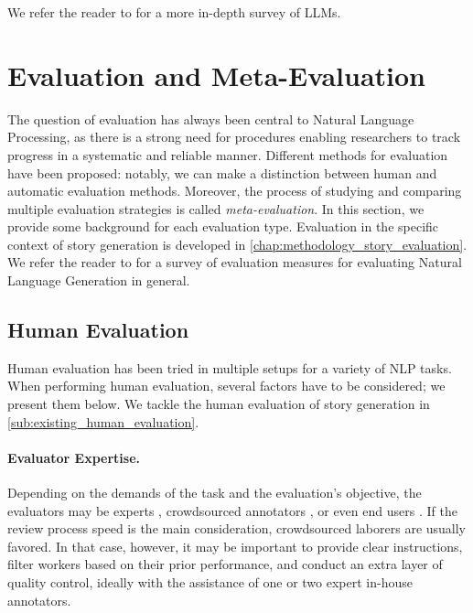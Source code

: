 We refer the reader to \citet{zhao2023survey} for a more in-depth survey of LLMs.

\section{Evaluation and Meta-Evaluation}
\label{sec:eval_and_meta}

The question of evaluation has always been central to Natural Language Processing, as there is a strong need for procedures enabling researchers to track progress in a systematic and reliable manner. Different methods for evaluation have been proposed: notably, we can make a distinction between human and automatic evaluation methods. Moreover, the process of studying and comparing multiple evaluation strategies is called \emph{meta-evaluation}. In this section, we provide some background for each evaluation type. Evaluation in the specific context of story generation is developed in \autoref{chap:methodology_story_evaluation}. We refer the reader to \citep{sai2022survey} for a survey of evaluation measures for evaluating Natural Language Generation in general.

\subsection{Human Evaluation}

Human evaluation has been tried in multiple setups for a variety of NLP tasks. When performing human evaluation, several factors have to be considered; we present them below. We tackle the human evaluation of story generation in \autoref{sub:existing_human_evaluation}.

\paragraph{Evaluator Expertise.} Depending on the demands of the task and the evaluation's objective, the evaluators may be experts \citep{belz-reiter-2006-comparing}, crowdsourced annotators \citep{callison-burch-2009-fast}, or even end users \citep{see-etal-2019-makes}. If the review process speed is the main consideration, crowdsourced laborers are usually favored. In that case, however, it may be important to provide clear instructions, filter workers based on their prior performance, and conduct an extra layer of quality control, ideally with the assistance of one or two expert in-house annotators.


